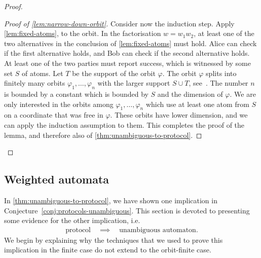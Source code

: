 \begin{proof}
\begin{proof}[Proof of \cref{lem:narrow-down-orbit}]
    Consider now the induction step. Apply \cref{lem:fixed-atoms}, to the orbit.  In the factorisation $w = w_1 w_2$, at least one of the two alternatives in the conclusion of \cref{lem:fixed-atoms} must hold. Alice can check if the first alternative holds, and Bob can check if the second alternative holds.  At least one of the two parties must report success, which is witnessed by some set $S$ of atoms. Let $T$ be the support of the orbit $\varphi$. The orbit $\varphi$ splits into finitely many orbits $\varphi_1,\ldots,\varphi_n$ with the larger support $S \cup T$, see~\cite[Lemma 10.9]{bojanczyk_slightly}. The number $n$ is bounded by a constant which is bounded by $S$ and the dimension of $\varphi$. We are only interested in the orbits among $\varphi_1,\ldots,\varphi_n$ which use at least one atom from $S$ on a coordinate that was free in $\varphi$. These orbits have lower dimension, and  we can apply the induction assumption to them. This completes the proof of the lemma, and therefore also of \cref{thm:unambiguous-to-protocol}.
\end{proof}
\end{proof}




\subsection{Weighted automata}
\label{sec:weighted-automata-atoms}

In \cref{thm:unambiguous-to-protocol}, we have shown one implication in Conjecture~\ref{conj:protocols-unambiguous}. This section is devoted to presenting some evidence for the other implication, i.e.
\begin{align}\label{eq:missing-orbit-finite-implication}
\text{protocol} \quad \implies \quad \text{unambiguous automaton}.
\end{align}
 We begin by explaining why the techniques that we used to prove this implication in the finite case do not extend to the orbit-finite case. 

